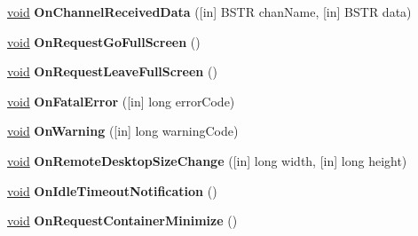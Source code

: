 \begin{DoxyCompactItemize}
\mbox{\label{interface_m_s_t_s_c_lib_1_1_i_ms_tsc_ax_events_a88d07583fffa36cfd5acf49c7c49025f}} 
\hyperlink{interfacevoid}{void} {\bfseries On\+Channel\+Received\+Data} (\mbox{[}in\mbox{]} B\+S\+TR chan\+Name, \mbox{[}in\mbox{]} B\+S\+TR data)
\item 
\mbox{\label{interface_m_s_t_s_c_lib_1_1_i_ms_tsc_ax_events_ab1f12282b8bced469a41cc985b7bdbff}} 
\hyperlink{interfacevoid}{void} {\bfseries On\+Request\+Go\+Full\+Screen} ()
\item 
\mbox{\label{interface_m_s_t_s_c_lib_1_1_i_ms_tsc_ax_events_acd893896cd397d02bcfee6f44ffdf971}} 
\hyperlink{interfacevoid}{void} {\bfseries On\+Request\+Leave\+Full\+Screen} ()
\item 
\mbox{\label{interface_m_s_t_s_c_lib_1_1_i_ms_tsc_ax_events_a64a598edaec4f3edcc54efb0268c3301}} 
\hyperlink{interfacevoid}{void} {\bfseries On\+Fatal\+Error} (\mbox{[}in\mbox{]} long error\+Code)
\item 
\mbox{\label{interface_m_s_t_s_c_lib_1_1_i_ms_tsc_ax_events_aff00887e28d0c990c338d0d777e59f5e}} 
\hyperlink{interfacevoid}{void} {\bfseries On\+Warning} (\mbox{[}in\mbox{]} long warning\+Code)
\item 
\mbox{\label{interface_m_s_t_s_c_lib_1_1_i_ms_tsc_ax_events_ab3bf506409fc77a83c1ab9c06b507179}} 
\hyperlink{interfacevoid}{void} {\bfseries On\+Remote\+Desktop\+Size\+Change} (\mbox{[}in\mbox{]} long width, \mbox{[}in\mbox{]} long height)
\item 
\mbox{\label{interface_m_s_t_s_c_lib_1_1_i_ms_tsc_ax_events_ae713aa7571b80180a99bbb412ec2f2a4}} 
\hyperlink{interfacevoid}{void} {\bfseries On\+Idle\+Timeout\+Notification} ()
\item 
\mbox{\label{interface_m_s_t_s_c_lib_1_1_i_ms_tsc_ax_events_ad4758bcd0c516eebfab1f63744c58bd2}} 
\hyperlink{interfacevoid}{void} {\bfseries On\+Request\+Container\+Minimize} ()

\end{DoxyCompactItemize}
